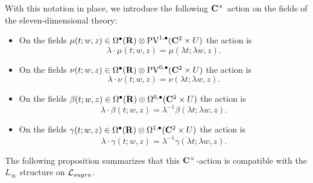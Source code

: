 With this notation in place, we introduce the following $\mathbf{C}^\times$ action on the fields of the eleven-dimensional theory:
\begin{itemize}
\item On the fields $\mu(t;w,z) \in \Omega^\bullet(\mathbf{R}) \otimes {\rm PV}^{1,\bullet}(\mathbf{C}^2 \times U)$ the action is
\[
\lambda \cdot \mu(t;w,z) = \mu(\lambda t;\lambda w , z).
\]
\item On the fields $\nu(t;w,z) \in \Omega^\bullet(\mathbf{R}) \otimes {\rm PV}^{0,\bullet}(\mathbf{C}^2 \times U)$ the action is
\[
\lambda \cdot \nu(t;w,z) = \nu(\lambda t;\lambda w , z).
\]
\item On the fields $\beta(t;w,z) \in \Omega^\bullet(\mathbf{R}) \otimes \Omega^{0,\bullet}(\mathbf{C}^2 \times U)$ the action is
\[
\lambda \cdot \beta(t;w,z) = \lambda^{-1} \beta(\lambda t;\lambda w , z).
\]
\item On the fields $\gamma(t;w,z) \in \Omega^\bullet(\mathbf{R}) \otimes \Omega^{1,\bullet}(\mathbf{C}^2 \times U)$ the action is
\[
\lambda \cdot \gamma(t;w,z) = \lambda^{-1} \gamma(\lambda t;\lambda w , z).
\]
\end{itemize}

The following proposition summarizes that this $\mathbf{C}^\times$-action is compatible with the $L_\infty$ structure on $\mathcal L_{sugra}$.

